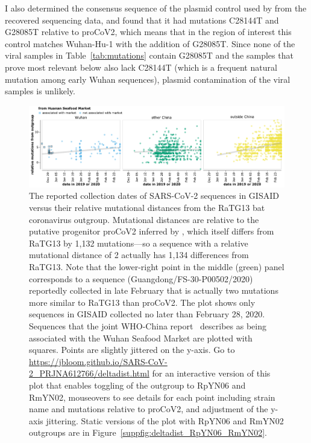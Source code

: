 \documentclass[9pt,twocolumn,twoside]{gsajnl_modified}
\begin{document}
I also determined the consensus sequence of the plasmid control used by \citet{wang2020medRxiv} from the recovered sequencing data, and found that it had mutations C28144T and G28085T relative to proCoV2, which means that in the region of interest this control matches Wuhan-Hu-1 with the addition of G28085T.
Since none of the viral samples in Table~\ref{tab:mutations} contain G28085T and the samples that prove most relevant below also lack C28144T (which is a frequent natural mutation among early Wuhan sequences), plasmid contamination of the viral samples is unlikely.

\begin{figure}
\centering
\includegraphics[width=\linewidth]{figures/deltadist_RaTG13.pdf}
\caption{The reported collection dates of SARS-CoV-2 sequences in GISAID versus their relative mutational distances from the RaTG13 bat coronavirus outgroup.
Mutational distances are relative to the putative progenitor proCoV2 inferred by \citet{kumar2021evolutionary}, which itself differs from RaTG13 by 1,132 mutations---so a sequence with a relative mutational distance of 2 actually has 1,134 differences from RaTG13.
Note that the lower-right point in the middle (green) panel corresponds to a sequence (Guangdong/FS-30-P00502/2020) reportedly collected in late February that is actually two mutations more similar to RaTG13 than proCoV2.
The plot shows only sequences in GISAID collected no later than February 28, 2020.
Sequences that the joint WHO-China report~\citep{WHO2021origins} describes as being associated with the Wuhan Seafood Market are plotted with squares.
Points are slightly jittered on the y-axis.
Go to \url{https://jbloom.github.io/SARS-CoV-2_PRJNA612766/deltadist.html} for an interactive version of this plot that enables toggling of the outgroup to RpYN06 and RmYN02, mouseovers to see details for each point including strain name and mutations relative to proCoV2, and adjustment of the y-axis jittering.
Static versions of the plot with RpYN06 and RmYN02 outgroups are in Figure~\ref{suppfig:deltadist_RpYN06_RmYN02}.
}
\label{fig:deltadist_RaTG13}
\end{figure}
\end{document}
